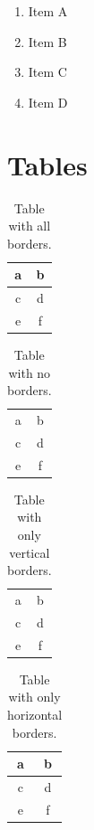 \documentclass[12pt, twoside]{book}
\begin{document}
\begin{enumerate}
    \item Item A
    \item Item B
    \item Item C
    \item Item D
\end{enumerate}

\section{Tables}

\begin{table}[h!]
    \centering
    \begin{tabular}{|c|c|} \hline
        a & b \\ \hline
        c & d \\ \hline
        e & f \\ \hline
    \end{tabular}
    \caption{Table with all borders.}
\end{table}

\vspace{12pt}

\begin{table}[h!]
    \centering
    \begin{tabular}{cc}
        a & b \\
        c & d \\
        e & f \\
    \end{tabular}
    \caption{Table with no borders.}
\end{table}

\vspace{12pt}

\begin{table}[h!]
    \centering
    \begin{tabular}{|c|c|}
        a & b \\
        c & d \\
        e & f \\
    \end{tabular}
    \caption{Table with only vertical borders.}
\end{table}

\vspace{12pt}

\begin{table}[h!]
    \centering
    \begin{tabular}{cc} \hline
        a & b \\ \hline
        c & d \\ \hline
        e & f \\ \hline
    \end{tabular}
    \caption{Table with only horizontal borders.}
\end{table}
\end{document}
